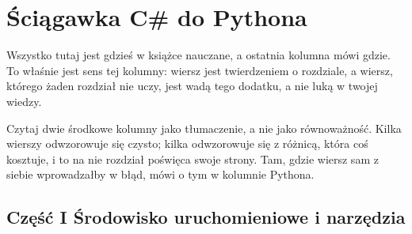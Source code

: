 
\chapter{Ściągawka C\# do Pythona}
\label{app:cheatsheet}

\noindent
Wszystko tutaj jest gdzieś w książce nauczane, a ostatnia kolumna mówi
gdzie. To właśnie jest sens tej kolumny: wiersz jest twierdzeniem o
rozdziale, a wiersz, którego żaden rozdział nie uczy, jest wadą tego
dodatku, a nie luką w twojej wiedzy.

Czytaj dwie środkowe kolumny jako tłumaczenie, a nie jako równoważność.
Kilka wierszy odwzorowuje się czysto; kilka odwzorowuje się z różnicą,
która coś kosztuje, i to na nie rozdział poświęca swoje strony. Tam, gdzie
wiersz sam z siebie wprowadzałby w błąd, mówi o tym w kolumnie Pythona.

\section{Część I \dash{} Środowisko uruchomieniowe i narzędzia}
\label{sec:appA-part1}

